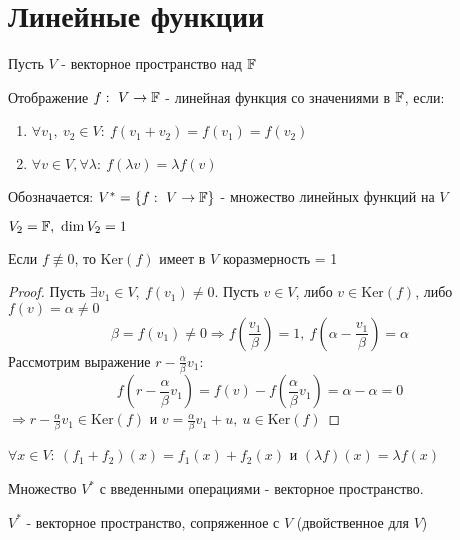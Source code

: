 \section{Линейные функции}
    Пусть $V$ - векторное пространство над $\mathbb F$
    \begin{definition}
        Отображение $f: \ V \to \mathbb F$ - линейная функция со значениями в $\mathbb F$, если:
        \begin{enumerate}
            \item $\forall v_1, \ v_2 \in V: \ f(v_1 + v_2) = f(v_1) = f(v_2)$
            \item $\forall v \in V, \forall \lambda : \ f(\lambda v) = \lambda f(v)$  
        \end{enumerate}
        Обозначается: $V^{*} = \{f : \ V \to \mathbb F\}$ - множество линейных функций на $V$  
    \end{definition}
    \begin{remark}
        $V_2 = \mathbb F, \ \dim V_2 = 1$ 
    \end{remark}
    \begin{lemma}
        Если $f \not \equiv 0$, то $\text{Ker}(f)$ имеет в $V$ коразмерность = 1 
    \end{lemma} 
    \begin{proof}
        Пусть $\exists v_1 \in V, \ f(v_1) \neq 0$. Пусть $v \in V$, либо $v \in \text{Ker}(f)$, либо $f(v) = \alpha \neq 0$ 
        $$\beta = f(v_1) \neq 0 \Longrightarrow f(\frac{v_1}{\beta}) = 1, \ f(\alpha - \frac{v_1}{\beta}) = \alpha$$
        Рассмотрим выражение $r - \frac{\alpha}{\beta}v_1$:
        $$f(r - \frac{\alpha}{\beta}v_1) = f(v) - f(\frac{\alpha}{\beta}v_1) = \alpha - \alpha = 0$$
        $\Longrightarrow r - \frac{\alpha}{\beta}v_1 \in \text{Ker}(f)$ и $v = \frac{\alpha}{\beta}v_1 + u, \ u \in \text{Ker}(f)$  
    \end{proof}
    \begin{remark}
        $\forall x \in V: \ (f_1 + f_2)(x) = f_1(x) + f_2(x)$  и $(\lambda f)(x) = \lambda f (x)$ 
    \end{remark}
    \begin{lemma}
        Множество $V^{*}$ с введенными операциями - векторное пространство. 
    \end{lemma}
    \begin{definition}
        $V^{*}$ - векторное пространство, сопряженное с $V$ (двойственное для $V$)
    \end{definition} 

